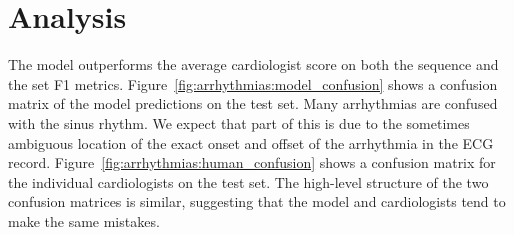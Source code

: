 \section{Analysis}

The model outperforms the average cardiologist score on both the sequence and
the set F1 metrics. Figure~\ref{fig:arrhythmias:model_confusion} shows a
confusion matrix of the model predictions on the test set. Many arrhythmias are
confused with the sinus rhythm. We expect that part of this is due to the
sometimes ambiguous location of the exact onset and offset of the arrhythmia in
the ECG record. Figure~\ref{fig:arrhythmias:human_confusion} shows a confusion
matrix for the individual cardiologists on the test set. The high-level
structure of the two confusion matrices is similar, suggesting that the model
and cardiologists tend to make the same mistakes.

